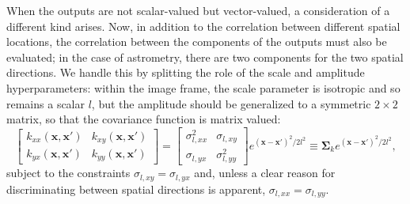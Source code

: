 \documentclass[manuscript]{aastex}
\newcommand{\bsS}{\boldsymbol\Sigma}
\begin{document}
When the outputs are not scalar-valued but vector-valued, a consideration of a different kind arises. Now, in addition to the correlation between different spatial locations, the correlation between the components of the outputs must also be evaluated; in the case of astrometry, there are two components for the two spatial directions. We handle this by splitting the role of the scale and amplitude hyperparameters: within the image frame, the scale parameter is isotropic and so remains a scalar $l$, but the amplitude should be generalized to a symmetric $2\times2$ matrix, so that the covariance function is matrix valued:
\begin{equation}
\left[\begin{array}{cc}
k_{xx}(\mathbf{x},\mathbf{x}') & k_{xy}(\mathbf{x},\mathbf{x}') \\ 
k_{yx}(\mathbf{x},\mathbf{x}') & k_{yy}(\mathbf{x},\mathbf{x}')
\end{array} \right] = 
\left[\begin{array}{cc}
\sigma_{l,xx}^2 & \sigma_{l,xy} \\
\sigma_{l,yx} & \sigma_{l,yy}^2
\end{array} \right]  e^{(\mathbf{x}-\mathbf{x}')^2/2l^2} \equiv \bsS_ke^{(\mathbf{x}-\mathbf{x}')^2/2l^2} ,
\end{equation}
subject to the constraints $\sigma_{l,xy}=\sigma_{l,yx}$ and, unless a clear reason for discriminating between spatial directions is apparent, $\sigma_{l,xx}=\sigma_{l,yy}$.
\end{document}
